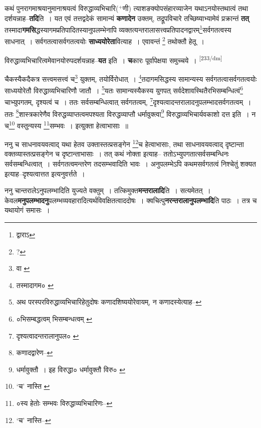 \documentclass[article,12pt,a4paper]{memoir}
\newcommand{\add}[1]{($^{+}$#1)}
\begin{document}
	  \pstart कथं पुनरागमाश्रयानुमानाश्रयत्वं विरुद्धाव्यभिचारि\add{णी} त्याशङक्योपसंहारव्याजेन यथाऽनयोस्तथात्वं तथा दर्शयन्नाह--\textbf{तदि}ति । यत एवं तत्तद्वदेकं सामान्यं \textbf{कणादेन} उक्तम्, तद्रूपविचारे तच्छिष्याभ्यामेवं प्रक्रान्तं \textbf{तत्} तस्मादा\textbf{गमसि}द्धस्यागमप्रतिपादितस्यानुपलम्भेनापि व्यक्तत्यन्तरालासत्त्वप्रतिपादनद्वारम्\footnote{द्वाराऽ}सर्वगतत्वस्य साधनात् । सर्वगतत्वासर्वगतत्वयोः \textbf{साध्ययोरेता}वित्याह । एवावन्तं \footnote{?} तथोक्तौ हेतू ।
	\pend
      

	  \pstart विरुद्धाव्यभिचारित्वमेवानयोरुपदर्शयन्नाह--\textbf{यत} इति । \textbf{च}कारः पूर्वापेक्षया समुच्चये ।  \leavevmode\textsuperscript{\rmlatinfont\tiny [233/dm]} 
	  
	चैकस्यैकदैकत्र सत्त्वमसत्त्वं च\footnote{वा \cite{dp-msD}} युक्तम्, तयोर्विरोधात् । \footnote{तस्मादागम० \cite{dp-msB}}तदागमसिद्धस्य सामान्यस्य सर्वगतत्वासर्वगतत्वयोः साध्ययोरेतौ विरुद्धाव्यभिचारिणौ जातौ । \footnote{अथ परस्परविरुद्धाव्यभिचारिहेतुदोषः कणादशिष्ययोरेवायम्, न कणादस्येत्याह--\cite{dp-msD-n}}यतः सामान्यस्यैकस्य युगपत् सर्वदेशावस्थितैरभिसम्बन्धित्वं\footnote{०भिसम्बद्धत्वम् \cite{dp-msB} भिसम्बन्धत्वम् \cite{dp-msD}} चाभ्युपगतम्, दृश्यत्वं च । ततः सर्वसम्बन्धित्वात् सर्वगतत्वम्, \footnote{दृश्यत्वादन्तरालानुपल० \cite{dp-msA} \cite{dp-msB} \cite{dp-msC} \cite{dp-msD} \cite{dp-edP} \cite{dp-edH} \cite{dp-edE} \cite{dp-edN}}दृश्यत्वादन्तरालादनुपलम्भादसर्वगतत्वम् । ततः \footnote{कणादद्वारेण--\cite{dp-msD-n}}शास्त्रकारेणैव विरुद्धव्याप्तत्वमपश्यता विरुद्धव्याप्तौ धर्मावुक्त्वा\footnote{धर्मावुक्तौ । इह विरुद्धा० \cite{dp-msB} धर्मावुक्तौ विरु० \cite{dp-msC} \cite{dp-msD}} विरुद्धाव्यभिचार्यवकाशो दत्त इति । न च\footnote{‘च’ नास्ति \cite{dp-msB} \cite{dp-msD}} वस्तुन्यस्य \footnote{०स्य हेतोः सम्भवः \cite{dp-msB} \cite{dp-msD} विरुद्धाव्यभिचारिणः--\cite{dp-msD-n}}सम्भवः । इत्युक्ता हेत्वाभासाः ॥ 
	  
	ननु च साधनावयवत्वाद् यथा हेतव उक्तास्तत्प्रसङ्गेन \footnote{‘च’ नास्ति--\cite{dp-msD}}च हेत्वाभासाः, तथा साधनावयवत्वाद् दृष्टान्ता वक्तव्यास्तत्प्रसङ्गेन च दृष्टान्ताभासाः । तत् कथं नोक्ता इत्याह-- ततोऽभ्युपगतात्सर्वसम्बन्धिनः सर्वसम्बन्धित्वात् । सर्वगतत्वमन्तरेण तदसम्भवादिति भावः । अनुपलम्भेऽपि कथमसर्वगतत्वं निश्चेतुं शक्यत इत्याह--दृश्यत्वात्तत इत्यनुवर्त्तते ।
	\pend
      

	  \pstart ननु चान्तरालेऽनुपलम्भादिति युज्यते वक्तुम् । तत्किमुक्त\textbf{मन्तरालादि}ति । सत्यमेतत् । केवल\textbf{मनुपलम्भादनु}पलम्भव्यवहारादित्यर्थविवक्षितत्वाददोषः । क्वचित्पु\textbf{नरन्तरालानुपलम्भादि}ति पाठः । तत्र च यथायोगं समासः ।
	\pend
      
\end{document}
